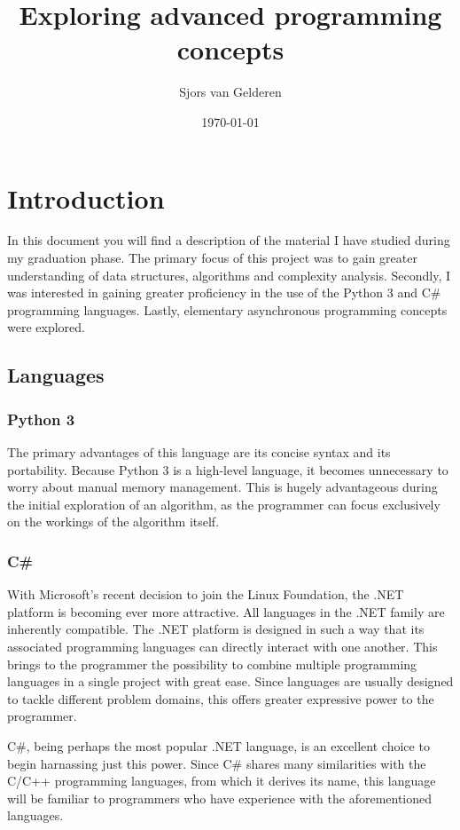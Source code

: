 \documentclass{article}
\author{Sjors van Gelderen}
\title{Exploring advanced programming concepts}
\date{\today{}}
\begin{document}
\maketitle{}
\newpage
\tableofcontents{}

\section{Introduction}
In this document you will find a description of the material I have studied during my graduation phase.
The primary focus of this project was to gain greater understanding of data structures, algorithms and complexity analysis.
Secondly, I was interested in gaining greater proficiency in the use of the Python 3 and C\# programming languages.
Lastly, elementary asynchronous programming concepts were explored.

\subsection{Languages}
\subsubsection{Python 3}
The primary advantages of this language are its concise syntax and its portability.
Because Python 3 is a high-level language, it becomes unnecessary to worry about manual memory management.
This is hugely advantageous during the initial exploration of an algorithm, as the programmer can focus exclusively on
the workings of the algorithm itself.

\subsubsection{C\#}
With Microsoft's recent decision to join the Linux Foundation, the .NET platform is becoming ever more attractive.
All languages in the .NET family are inherently compatible. The .NET platform is designed in such a way that its associated programming
languages can directly interact with one another. This brings to the programmer the possibility to combine multiple programming languages
in a single project with great ease. Since languages are usually designed to tackle different problem domains, this offers greater expressive power
to the programmer.

C\#, being perhaps the most popular .NET language, is an excellent choice to begin harnassing just this power.
Since C\# shares many similarities with the C/C++ programming languages, from which it derives its name,
this language will be familiar to programmers who have experience with the aforementioned languages.
\end{document}
